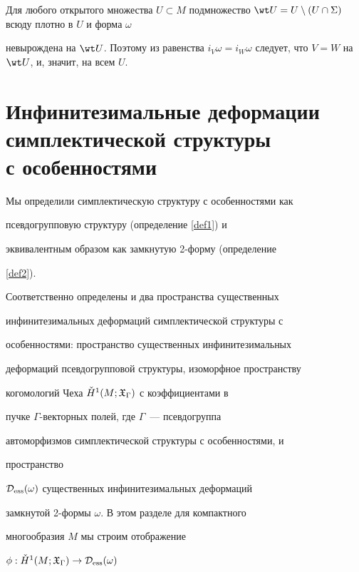 \begin{pf}


Для любого открытого множества $U \subset M$ подмножество $\wt U


= U \setminus (U \cap \Sigma)$ всюду плотно в $U$ и форма $\omega$


невырождена на $\wt U$. Поэтому из равенства $i_V\omega =


i_W\omega$ следует, что $V=W$ на $\wt U$, и, значит, на всем $U$.


\end{pf}








\section{Инфинитезимальные деформации симплектической структуры\protect\\


с особенностями}





Мы определили симплектическую структуру с особенностями как


псевдогрупповую структуру (определение \ref{def1}) и


эквивалентным образом как замкнутую 2-форму (определение


\ref{def2}).


Соответственно определены и два пространства существенных


инфинитезимальных деформаций симплектической структуры с


особенностями: пространство существенных инфинитезимальных


деформаций псевдогрупповой структуры, изоморфное пространству


когомологий Чеха $\check H^1(M;{\frak X}_\Gamma)$ с коэффициентами в


пучке $\Gamma$-векторных полей, где $\Gamma$~--- псевдогруппа


автоморфизмов симплектической структуры с особенностями, и


пространство


${\cal D}_{\operatorname{ess}}(\omega)$ существенных инфинитезимальных деформаций


замкнутой 2-формы $\omega$. В этом разделе для компактного


многообразия $M$ мы строим отображение


$\phi : \check H^1(M; {{\frak X}}_\Gamma) \to {\cal D}_{\operatorname{ess}}(\omega)$



